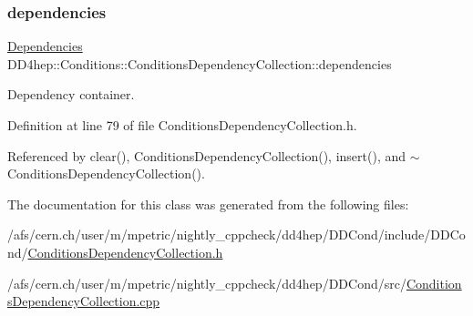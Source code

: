 \subsubsection{\texorpdfstring{dependencies}{dependencies}}
{\footnotesize\ttfamily \hyperlink{class_d_d4hep_1_1_conditions_1_1_conditions_dependency_collection_a7fb4072b6036f59389b929e312e2679c}{Dependencies} D\+D4hep\+::\+Conditions\+::\+Conditions\+Dependency\+Collection\+::dependencies}



Dependency container. 



Definition at line 79 of file Conditions\+Dependency\+Collection.\+h.



Referenced by clear(), Conditions\+Dependency\+Collection(), insert(), and $\sim$\+Conditions\+Dependency\+Collection().



The documentation for this class was generated from the following files\+:\begin{DoxyCompactItemize}
\item 
/afs/cern.\+ch/user/m/mpetric/nightly\+\_\+cppcheck/dd4hep/\+D\+D\+Cond/include/\+D\+D\+Cond/\hyperlink{_conditions_dependency_collection_8h}{Conditions\+Dependency\+Collection.\+h}\item 
/afs/cern.\+ch/user/m/mpetric/nightly\+\_\+cppcheck/dd4hep/\+D\+D\+Cond/src/\hyperlink{_conditions_dependency_collection_8cpp}{Conditions\+Dependency\+Collection.\+cpp}\end{DoxyCompactItemize}
